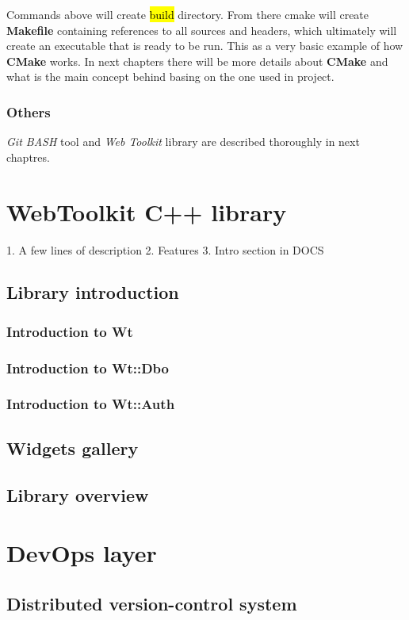 \documentclass[a4paper,12pt]{article}
\begin{document}
{{\bigskip Commands above will create \hl{build} directory. From there cmake will create \textbf{Makefile} containing references to all sources and headers, which ultimately will create an executable that is ready to be run. This as a very basic example of how \textbf{CMake} works. In next chapters there will be more details about \textbf{CMake} and what is the main concept behind basing on the one used in project. 

}

\subsubsection*{Others}
\textit{Git BASH} tool and \textit{Web Toolkit} library are described thoroughly in next chaptres.
\newpage

\section{WebToolkit C++ library}
1. A few lines of description
2. Features
3. Intro section in DOCS
\subsection{Library introduction}
\subsubsection{Introduction to Wt}
\subsubsection{Introduction to Wt::Dbo}
\subsubsection{Introduction to Wt::Auth}
\subsection{Widgets gallery}
\subsection{Library overview}

\section{DevOps layer}
\subsection{Distributed version-control system}}
\end{document}
